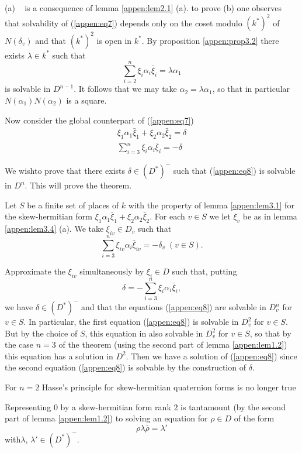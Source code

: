 \medskip
{}

(a) ~ is a consequence of lemma \ref{appen:lem2.1} (a). to prove (b)
one observes 
that solvability of (\ref{appen:eq7}) depends only on the coset modulo $(k^*)^2$
of $N(\delta_v)$ and that $(k^*)^2$ is open in $k^*$. By proposition
\ref{appen:prop3.2} there exists $\lambda \in k^*$ such that  
$$
\sum^{n}_{i=2} \xi_i \alpha_i \bar{\xi}_i= \lambda \alpha_1
$$
is solvable in $D^{n-1}$. It follows that we may take $\alpha_2 =
\lambda \alpha_1$, so that in particular $N(\alpha_1)N(\alpha_2)$ is a
square. 

Now consider the global counterpart of (\ref{appen:eq7})
\begin{gather*}
\xi_1 \alpha_1 \bar{\xi}_1 +\xi_2 \alpha_2 \bar{\xi}_2 = \delta\\
\sum^n _{i=3} \xi_i \alpha_i \bar{\xi}_i = - \delta \tag{8}\label{appen:eq8}
\end{gather*}

We wish\pageoriginale to prove that there exists $\delta \in (D^*)^-$
such that (\ref{appen:eq8}) is solvable in $D^n$. This will prove the
theorem.  

Let $S$ be a finite set of places of $k$ with the property of lemma
\ref{appen:lem3.1} for the skew-hermitian form $\xi_1 \alpha_1
\bar{\xi}_1 +\xi_2 
\alpha_2 \bar \xi_2$. For each $v \in S$ we let $\xi_v$ be as in lemma
\ref{appen:lem3.4} (a). We take $\xi_{iv} \in D_v$ such that 
$$ 
\sum^n_{i = 3} \xi_{iv} \alpha_i \bar{\xi}_{iv} = - \delta_v \; (v \in S). 
$$

Approximate the $\xi_{iv}$ simultaneously by $\xi_i \in D$ such that,
putting 
$$
\delta = - \sum^n_{i = 3} \xi_{i} \alpha_i \bar{\xi}_{i}, 
$$
we have $\delta \in (D^*)^-$ and that the equations (\ref{appen:eq8}) are solvable
in $D^n_v$ for $v \in S$. In particular, the first equation (\ref{appen:eq8}) is
solvable in $D^2_v$ for $v \in S$. But by the choice of $S$, this
equation in also solvable in $D^2_v$ for $v \in S$, so that by the
case $n = 3$ of the theorem (using the second part of lemma \ref{appen:lem1.2})
this equation has a solution in $D^2$. Then we have a solution of
(\ref{appen:eq8}) since the second equation (\ref{appen:eq8}) is solvable by the construction
of $\delta$. 


\medskip
{}%

For $n = 2$ Hasse's principle for skew-hermitian quaternion forms is
no longer true 			 	 

Representing 0 by a skew-hermitian form rank $2$ is tantamount (by
the second part of lemma \ref{appen:lem1.2}) to solving an equation
for $\rho \in 
D$ of the form 
$$
\rho \lambda \bar{\rho} = \lambda'  
$$
with\pageoriginale $\lambda$, $\lambda' \in (D^*)^-$.

